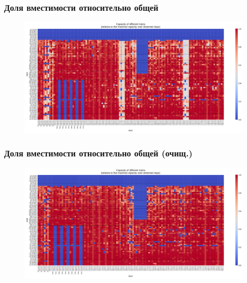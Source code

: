 \documentclass[11pt,aspectratio=169]{beamer}
\begin{document}
\begin{frame}
    \frametitle{Доля вместимости относительно общей}

    \begin{figure}
        \centering
        \includegraphics[width=\textwidth]{../data/figures/capacity.pdf}
    \end{figure}

\end{frame}


\begin{frame}
    \frametitle{Доля вместимости относительно общей (очищ.)}

    \begin{figure}
        \centering
        \includegraphics[width=\textwidth]{../data/figures/capacity_clean.pdf}
    \end{figure}

\end{frame}
\end{document}
